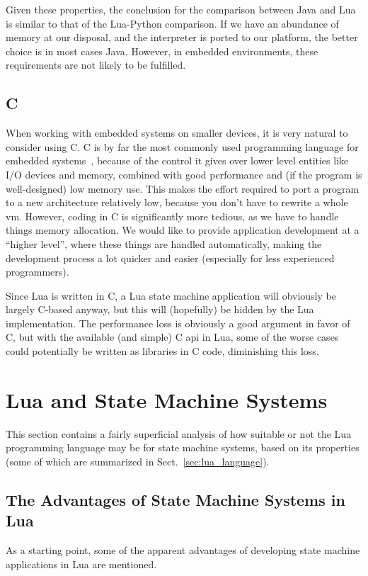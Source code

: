 Given these properties, the conclusion for the comparison between Java and Lua is similar to that of the Lua-Python comparison. If we have an abundance of memory at our disposal, and the interpreter is ported to our platform, the better choice is in most cases Java. However, in embedded environments, these requirements are not likely to be fulfilled.

\subsection{C}
\label{sec:lua_vs_c}
When working with embedded systems on smaller devices, it is very natural to consider using C. C is by far the most commonly used programming language for embedded systems~\cite{phd:dunkels}, because of the control it gives over lower level entities like I/O devices and memory, combined with good performance and (if the program is well-designed) low memory use. This makes the effort required to port a program to a new architecture relatively low, because you don't have to rewrite a whole \gls{vm}. However, coding in C is significantly more tedious, as we have to handle things memory allocation. We would like to provide application development at a ``higher level'', where these things are handled automatically, making the development process a lot quicker and easier (especially for less experienced programmers).

Since Lua is written in C, a Lua state machine application will obviously be largely C-based anyway, but this will (hopefully) be hidden by the Lua implementation. The performance loss is obviously a good argument in favor of C, but with the available (and simple) C \gls{api} in Lua, some of the worse cases could potentially be written as libraries in C code, diminishing this loss.

\section{Lua and State Machine Systems}
\label{sec:lua_and_state_machines}
This section contains a fairly superficial analysis of how suitable or not the Lua programming language may be for state machine systems, based on its properties (some of which are summarized in Sect.~\ref{sec:lua_language}).

\subsection{The Advantages of State Machine Systems in Lua}
\label{sec:lua_advantages}
As a starting point, some of the apparent advantages of developing state machine applications in Lua are mentioned.

